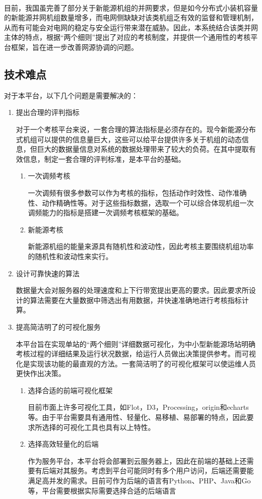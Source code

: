 \documentclass[winfonts,UTF8,a4paper]{ctexart}
\newcommand{\upcite}[1]{{\textsuperscript{\cite{#1}}}}
\begin{document}
目前，我国虽完善了部分关于新能源机组的并网要求\upcite{电网运行准则}，但是如今分布式小装机容量的新能源并网机组数量增多，而电网侧缺缺对该类机组乏有效的监督和管理机制，从而有可能会对电网的稳定与安全运行带来潜在威胁。因此，本系统结合该类并网主体的特点，根据“两个细则”提出了对应的考核制度，并提供一个通用性的考核平台框架，旨在进一步改善网源协调的问题。

\subsection{技术难点}

对于本平台，以下几个问题是需要解决的：
\begin{enumerate}
	\item 提出合理的评判指标
	
	对于一个考核平台来说，一套合理的算法指标是必须存在的。现今新能源分布式机组可以提供的信息量巨大，这些可以给平台提供许多关于机组的动态信息，但巨大的数据量信息对系统的数据处理带来了较大的负荷。在其中提取有效信息，制定一套合理的评判标准，是本平台的基础。
	
		\begin{enumerate}
		\item 一次调频考核
		
		一次调频有很多参数可以作为考核的指标，包括动作时效性、动作准确性、动作精确性等。对于这些指标数据，选取一个可以综合体现机组一次调频能力的指标是搭建一次调频考核框架的基础。
		
		\item 新能源考核
		
		新能源机组的能量来源具有随机性和波动性，因此考核主要围绕机组功率的随机性和波动性来实行。
	\end{enumerate}
	\item 设计可靠快速的算法
	
	数据量大会对服务器的处理速度和上下行带宽提出更高的要求。因此要求所设计的算法需要在大量数据中筛选出有用数据，并快速准确地进行考核指标计算。

	
	\item 提高简洁明了的可视化服务
	
	本平台旨在实现单站的“两个细则”详细数据可视化，为中小型新能源场站明确考核过程的详细结果及运行状况数据，给运行人员做出决策提供参考。而可视化是实现该功能的最直观的方法。一套简洁明了的可视化框架可以使运维人员更快作出决策。
	
	\begin{enumerate}
		\item 选择合适的前端可视化框架
		
		目前市面上许多可视化工具，如Flot，D3，Processing，origin和echarts等。由于平台需要具有通用性、轻量化、易移植、易部署的特点，因此要求所选择的可视化工具也具有以上特性。
		\item 选择高效轻量化的后端
		
		作为服务平台，本平台将会部署到云服务器上，因此在前端的基础上还需要有后端对其服务。考虑到平台可能同时有多个用户访问，后端还需要能满足高并发的需求。目前可作为后端的语言有Python、PHP、Java和Go等，平台需要根据实际需要选择合适的后端语言
	\end{enumerate}
\end{enumerate}
\end{document}
